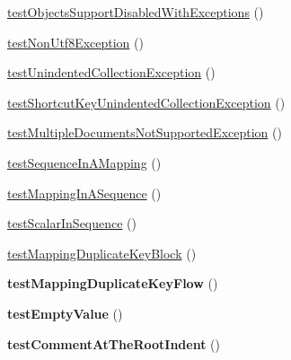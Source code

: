 \begin{DoxyCompactItemize}
\item 
\hyperlink{class_symfony_1_1_component_1_1_yaml_1_1_tests_1_1_parser_test_a91b201d287c39ca9be2a84a213f9659e}{test\+Objects\+Support\+Disabled\+With\+Exceptions} ()
\item 
\hyperlink{class_symfony_1_1_component_1_1_yaml_1_1_tests_1_1_parser_test_a0e02d367703ae13e8e7b88dd7f06cc4a}{test\+Non\+Utf8\+Exception} ()
\item 
\hyperlink{class_symfony_1_1_component_1_1_yaml_1_1_tests_1_1_parser_test_aadaf3d83de85b517271407bc54b8ef54}{test\+Unindented\+Collection\+Exception} ()
\item 
\hyperlink{class_symfony_1_1_component_1_1_yaml_1_1_tests_1_1_parser_test_aac3fb84b0309ed68f476f61cadac8642}{test\+Shortcut\+Key\+Unindented\+Collection\+Exception} ()
\item 
\hyperlink{class_symfony_1_1_component_1_1_yaml_1_1_tests_1_1_parser_test_a2e9e13037d52f78099b1afc677b4962e}{test\+Multiple\+Documents\+Not\+Supported\+Exception} ()
\item 
\hyperlink{class_symfony_1_1_component_1_1_yaml_1_1_tests_1_1_parser_test_a9347d26eb72020d8a03fe34c0d311895}{test\+Sequence\+In\+A\+Mapping} ()
\item 
\hyperlink{class_symfony_1_1_component_1_1_yaml_1_1_tests_1_1_parser_test_a9aa015561d9c9407cab43f6be94536e1}{test\+Mapping\+In\+A\+Sequence} ()
\item 
\hyperlink{class_symfony_1_1_component_1_1_yaml_1_1_tests_1_1_parser_test_a80633f6896a5e92dae76b16be88c97e7}{test\+Scalar\+In\+Sequence} ()
\item 
\hyperlink{class_symfony_1_1_component_1_1_yaml_1_1_tests_1_1_parser_test_a25c95f2d7584175a9efb960799383a56}{test\+Mapping\+Duplicate\+Key\+Block} ()
\item 
{\bfseries test\+Mapping\+Duplicate\+Key\+Flow} ()\hypertarget{class_symfony_1_1_component_1_1_yaml_1_1_tests_1_1_parser_test_aa71fb50154fd6d770e8322ca6ba49447}{}\label{class_symfony_1_1_component_1_1_yaml_1_1_tests_1_1_parser_test_aa71fb50154fd6d770e8322ca6ba49447}

\item 
{\bfseries test\+Empty\+Value} ()\hypertarget{class_symfony_1_1_component_1_1_yaml_1_1_tests_1_1_parser_test_af62a4728914f98cc9de68db8d2795941}{}\label{class_symfony_1_1_component_1_1_yaml_1_1_tests_1_1_parser_test_af62a4728914f98cc9de68db8d2795941}

\item 
{\bfseries test\+Comment\+At\+The\+Root\+Indent} ()\hypertarget{class_symfony_1_1_component_1_1_yaml_1_1_tests_1_1_parser_test_a74026136dc076e27fa4494852ec4d049}{}\label{class_symfony_1_1_component_1_1_yaml_1_1_tests_1_1_parser_test_a74026136dc076e27fa4494852ec4d049}


\end{DoxyCompactItemize}

